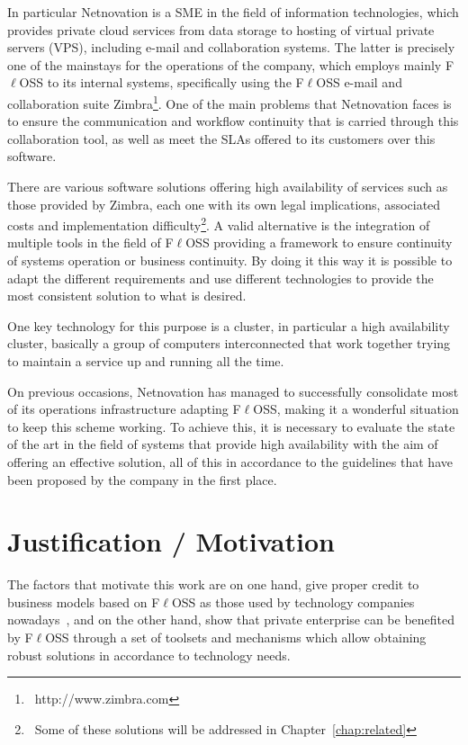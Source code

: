 \documentclass[a4paper, 12pt]{book}
\begin{document}
\noindent In particular Netnovation is a SME in the field of information technologies, which provides private cloud services from data storage to hosting of virtual private servers (VPS), including e-mail and collaboration systems. The latter is precisely one of the mainstays for the operations of the company, which employs mainly F$\ell$OSS to its internal systems, specifically using the F$\ell$OSS e-mail and collaboration suite Zimbra\texttrademark\footnote{\ http://www.zimbra.com}. One of the main problems that Netnovation faces is to ensure the communication and workflow continuity that is carried through this collaboration tool, as well as meet the SLAs offered to its customers over this software.\bigskip

\noindent There are various software solutions offering high availability of services such as those provided by Zimbra, each one with its own legal implications, associated costs and implementation difficulty\footnote{\ Some of these solutions will be addressed in Chapter~\ref{chap:related}}. A valid alternative is the integration of multiple tools in the field of F$\ell$OSS providing a framework to ensure  continuity of systems operation or business continuity. By doing it this way it is possible to adapt the different requirements and use different technologies to provide the most consistent solution to what is desired.\bigskip

\noindent One key technology for this purpose is a cluster, in particular a high availability cluster, basically a group of computers interconnected that work together trying to maintain a service up and running all the time.\bigskip

\noindent On previous occasions, Netnovation has managed to successfully consolidate most of its operations infrastructure adapting F$\ell$OSS, making it a wonderful situation to keep this scheme working. To achieve this, it is necessary to evaluate the state of the art in the field of systems that provide high availability with the aim of offering an effective solution, all of this in accordance to the guidelines that have been proposed by the company in the first place.


\section{Justification / Motivation}
\label{sec:justification}

The factors that motivate this work are on one hand, give proper credit to business models based on F$\ell$OSS as those used by technology companies nowadays~\cite{Daffara2}, and on the other hand, show that private enterprise can be benefited by F$\ell$OSS  through a set of toolsets and mechanisms which allow obtaining robust solutions in accordance to technology needs.
\end{document}
